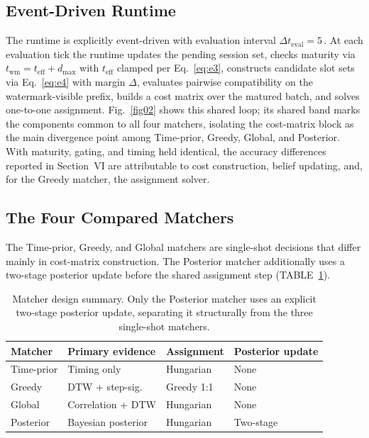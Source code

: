 \documentclass{ieeeaccess}
\newif\ifhighlight \highlightfalse
\DeclareRobustCommand{\revised}[1]{\ifhighlight{\color{blue}#1}\else{\color{.}#1}\fi}
\begin{document}
    \subsection{Event-Driven Runtime}
    The runtime is explicitly event-driven with evaluation interval $\Delta t_{\text{eval}} = 5$\,.
    At each evaluation tick the runtime updates the pending session set, checks maturity via $t_{\text{wm}} = t_{\text{eff}} + d_{\max}$ with $t_{\text{eff}}$ clamped per Eq.~\eqref{eq:e3}, constructs candidate slot sets via Eq.~\eqref{eq:e4} with margin $\Delta$, evaluates pairwise compatibility on the watermark-visible prefix, builds a cost matrix over the matured batch, and solves one-to-one assignment.
    Fig.~\ref{fig02} shows this shared loop; its shared band marks the components common to all four matchers\revised{,} isolating the cost-matrix block as the \revised{main} divergence point among Time-prior, Greedy, Global, and Posterior.
    With maturity, gating, and timing held identical, the accuracy differences reported in Section~VI are attributable to cost construction\revised{, belief updating, and, for the Greedy matcher, the assignment solver}.

    \subsection{\revised{The Four Compared Matchers}}
    The Time-prior, Greedy, and Global matchers are single-shot decisions that differ \revised{mainly} in cost-matrix construction.
    The Posterior matcher additionally uses a two-stage posterior update before the shared assignment step (TABLE~\ref{table2}).

    \begin{table}[htbp]
        \caption{Matcher design summary. \revised{Only the Posterior matcher uses an explicit two-stage posterior update, separating it structurally from the three single-shot matchers.}}
        \label{table2}
        \centering
        \setlength{\tabcolsep}{3pt}
        \scriptsize
        \begin{tabular}{@{}l p{2.1cm} p{1.5cm} p{1.3cm}@{}}
            \toprule
            \textbf{Matcher} & \textbf{Primary evidence} & \textbf{Assignment} & \textbf{Posterior update} \\
            \midrule
            Time-prior & Timing only & Hungarian & None \\
            Greedy & DTW + step-sig. & Greedy 1:1 & None \\
            Global & Correlation + DTW & Hungarian & None \\
            Posterior & Bayesian posterior & Hungarian & Two-stage \\
            \bottomrule
        \end{tabular}
    \end{table}
\end{document}
